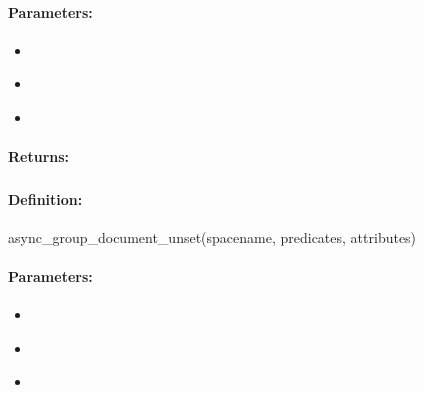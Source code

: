 \paragraph{Parameters:}
\begin{itemize}[noitemsep]
\item {}\\

\item {}\\

\item {}\\

\end{itemize}

\paragraph{Returns:}


\pagebreak
\subsubsection{}
\label{api:ruby:async_group_document_unset}


\paragraph{Definition:}
\begin{rubycode}
async_group_document_unset(spacename, predicates, attributes)
\end{rubycode}

\paragraph{Parameters:}
\begin{itemize}[noitemsep]
\item {}\\

\item {}\\

\item {}\\

\end{itemize}

